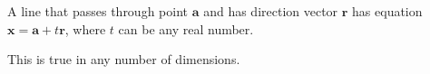 
A line that passes through point $\mathbf{a}$ and has direction vector $\mathbf{r}$ has equation $\mathbf{x}=\mathbf{a}+t\mathbf{r}$, where $t$ can be any real number. 
\par
This is true in any number of dimensions.
  
  
  